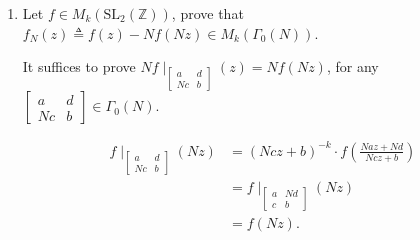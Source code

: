 \begin{enumerate}
\begin{proofc}[解答]
Back to the problem, pick $\gamma = \begin{bmatrix}
    a & b \\
    Nc & d
\end{bmatrix} \in \Gamma_0(N)$, we have:
$$E_2(\gamma z) = (Ncz+d)^2 E_2(z) + \frac{6Nc(Ncz+d)}{\pi i}.$$
\begin{align}
   E_2(N\gamma z) &= E_2(\begin{bmatrix}
    a & Nb \\
    c & d
   \end{bmatrix} Nz) \\
   &= (Ncz+d)^2 E_2(Nz) + \frac{6c(Ncz+d)}{\pi i}.
\end{align}
Therefore we have:
\begin{align}
    (E_{2,N}\mid_{\gamma})(z) &= (Ncz+d)^{-2}E_{2,N}(z) \\
&= (Ncz+d)^{-2}(E_2(\gamma z) - NE_2(N\gamma z)) \\
&= (Ncz+d)^{-2}((Ncz+d)^2 E_2(z) + \frac{6Nc(Ncz+d)}{\pi i} - (Ncz+d)^2 E_2(Nz) - \frac{6c(Ncz+d)}{\pi i}) \\
&= E_{2, N}(z).
\end{align}

\end{proofc}




\item
Let $f \in M_k(\mathrm{SL}_2(\mathbb{Z}))$, prove that $f_{N}(z) \triangleq f(z) - N f(Nz) \in M_k(\Gamma_0(N))$.
\begin{proofc}[解答]

It suffices to prove $\displaystyle Nf \mid_{\begin{bmatrix}
    a & d \\
    Nc & b
\end{bmatrix}}(z) = Nf(Nz)$, for any $\begin{bmatrix}
    a & d \\
    Nc & b
\end{bmatrix} \in \Gamma_0(N)$.

\begin{align}
    f \mid_{\begin{bmatrix}
    a & d \\
    Nc & b
\end{bmatrix}}(Nz) &= (Ncz+b)^{-k} \cdot f(\frac{Naz+Nd}{Ncz+b}) \\
 &= f\mid_{\begin{bmatrix}
    a & Nd \\
    c & b
 \end{bmatrix}}(Nz) \\
 &= f(Nz).
\end{align}
\end{proofc}


\end{enumerate}
